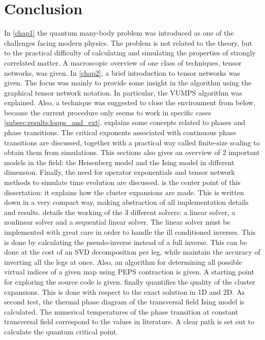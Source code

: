 \section{Conclusion}

In \cref{chap1} the quantum many-body problem was introduced as one of the challenges facing modern physics. The problem is not related to the theory, but to the practical difficulty of calculating and simulating the properties of strongly correlated matter. A macroscopic overview of one class of techniques, tensor networks, was given.
In \cref{chap2}, a brief introduction to tensor networks was given. The focus was mainly to provide some insight in the algorithm using the graphical tensor network notation. In particular, the VUMPS algorithm was explained. Also, a technique was suggested to close the environment from below, because the current procedure only seems to work in specific cases \cref{subsec:results:loops_and_ext}.
 explains some concepts related to phases and phase transitions. The critical exponents associated with continuous phase transitions are discussed, together with a practical way called finite-size scaling to obtain them from simulations. This sections also gives an overview of 2 important models in the field: the Heisenberg model and the Ising model in different dimension. Finally, the need for operator exponentials and tensor network methods to simulate time evolution are discussed.
 is the center point of this dissertation: it explains how the cluster expansions are made. This is written down in a very compact way, making abstraction of all implementation details and results.
 details the working of the 3 different solvers: a linear solver, a nonlinear solver and a sequential linear solver. The linear solver must be implemented with great care in order to handle the ill conditioned inverses. This is done by calculating the pseudo-inverse instead of a full inverse. This can be done at the cost of an SVD decomposition per leg, while maintain the accuracy of inverting all the legs at once. Also, an algorithm for determining all possible virtual indices of a given map using PEPS contraction is given.  A starting point for exploring the source code is given.
 finally quantifies the quality of the cluster expansions. This is done with respect to the exact solution in 1D and 2D. As second test, the thermal phase diagram of the transversal field Ising model is calculated. The numerical temperatures of the phase transition at constant transversal field correspond to the values in literature. A clear path is set out to calculate the quantum critical point.

